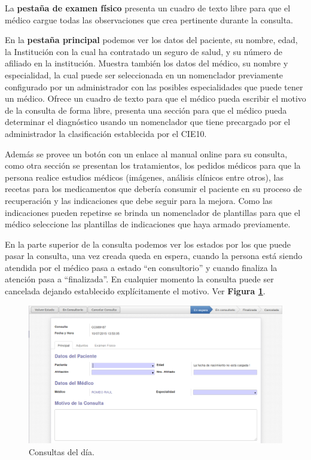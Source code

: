 La \textbf{pestaña de examen físico} presenta un cuadro de texto libre para que el médico cargue todas las observaciones que crea pertinente durante la consulta.

En la \textbf{pestaña principal} podemos ver los datos del paciente, su nombre, edad, la Institución con la cual ha contratado un seguro de salud, y su número de afiliado en la institución. Muestra también los datos del médico, su nombre y especialidad, la cual puede ser seleccionada en un nomenclador previamente configurado por un administrador con las posibles especialidades que puede tener un médico.
Ofrece un cuadro de texto para que el médico pueda escribir el motivo de la consulta de forma libre, presenta una sección para que el médico pueda determinar el diagnóstico usando un nomenclador que tiene precargado por el administrador la clasificación establecida por el CIE10.

Además se provee un botón con un enlace al manual online para su consulta, como otra sección se presentan los tratamientos, los pedidos médicos para que la persona realice estudios médicos (imágenes, análisis clínicos entre otros), las recetas para los medicamentos que debería consumir el paciente en su proceso de recuperación y las indicaciones que debe seguir para la mejora. Como las indicaciones pueden repetirse se brinda un nomenclador de plantillas para que el médico seleccione las plantillas de indicaciones que haya armado previamente.

En la parte superior de la consulta podemos ver los estados por los que puede pasar la consulta, una vez creada queda en espera, cuando la persona está siendo atendida por el médico pasa a estado ``en consultorio'' y cuando finaliza la atención pasa a ``finalizada''. En cualquier momento la consulta puede ser cancelada dejando establecido explícitamente el motivo. Ver \textbf{Figura \ref{consulta-dia}}.

\begin{figure}[h]
      \centering
      \includegraphics[width=.8\textwidth]{img/tp1/HE/ConsultaDia}
      \caption{Consultas del día.}
      \label{consulta-dia}
\end{figure}


